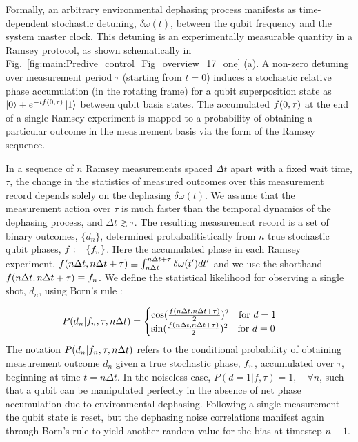 \documentclass[pra, reprint]{revtex4-1}
\begin{document}
Formally, an arbitrary environmental dephasing process manifests as time-dependent stochastic detuning, $\delta \omega (t)$, between the qubit frequency and the system master clock. This detuning is an experimentally measurable quantity in a Ramsey protocol, as shown schematically in Fig.~\ref{fig:main:Predive_control_Fig_overview_17_one} (a). A non-zero detuning over measurement period $\tau$ (starting from $t=0$) induces a stochastic relative phase accumulation (in the rotating frame) for a qubit superposition state as $\left|0\right\rangle+e^{-if(0, \tau)}\left|1\right\rangle$ between qubit basis states.  The accumulated $f(0, \tau)$ at the end of a single Ramsey experiment is mapped to a probability of obtaining a particular outcome in the measurement basis via the form of the Ramsey sequence.  

In a sequence of $n$ Ramsey measurements spaced $\Delta t$ apart with a fixed wait time, $\tau$, the change in the statistics of measured outcomes over this measurement record depends solely on the dephasing  $\delta \omega(t)$.   We assume that the measurement action over $\tau$ is much faster than the temporal dynamics of the dephasing process, and $\Delta t \gtrsim \tau$. The resulting measurement record is a set of binary outcomes,  $\{d_n\}$, determined probabalitistically from $n$ true stochastic qubit phases, $f := \{f_n\}$. Here the accumulated phase in each Ramsey experiment, $ f(n \Delta t, n\Delta t + \tau) \equiv \int_{n \Delta t}^{n \Delta t +\tau} \delta \omega(t') dt'$ and we use the shorthand $f(n \Delta t , n\Delta t + \tau) \equiv f_n$.  We define the statistical likelihood for observing a single shot, $d_n$, using Born's rule \cite{ferrie2013}:

\begin{align}
P(d_n | f_n, \tau, n \Delta t) &= \begin{cases} \cos(\frac{f(n \Delta t, n\Delta t + \tau)}{2})^2 \quad \text{for $d=1$} \\   \sin(\frac{f(n \Delta t, n\Delta t + \tau)}{2})^2  \quad \text{for $ d=0$} \end{cases} \label{eqn:main:likelihood}
\end{align}
The notation $P(d_n | f_n, \tau, n \Delta t)$ refers to the conditional probability of obtaining measurement outcome $d_n$ given a true stochastic phase, $f_n$, accumulated over $\tau$, beginning at time $t = n \Delta t$. In the noiseless case, $P(d=1| f, \tau) = 1, \quad \forall n $, such that a qubit can be manipulated perfectly in the absence of net phase accumulation due to environmental dephasing. Following a single measurement the qubit state is reset, but the dephasing noise correlations manifest again through Born's rule to yield another random value for the bias at timestep $n+1$. %
\end{document}
